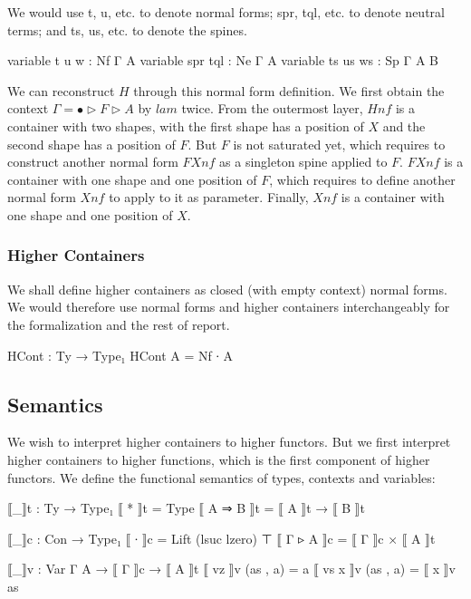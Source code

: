 We would use t, u, etc. to denote normal forms; spr, tql, etc. to denote neutral terms; and ts, us, etc. to denote the spines.

\begin{code}[hide]
variable t u w : Nf Γ A
variable spr tql : Ne Γ A
variable ts us ws : Sp Γ A B
\end{code}

We can reconstruct $H$ through this normal form definition. We first obtain the context $\Gamma = \bullet \triangleright F \triangleright A$ by $lam$ twice. From the outermost layer, $Hnf$ is a container with two shapes, with the first shape has a position of $X$ and the second shape has a position of $F$. But $F$ is not saturated yet, which requires to construct another normal form $FXnf$ as a singleton spine applied to $F$. $FXnf$ is a container with one shape and one position of $F$, which requires to define another normal form $Xnf$ to apply to it as parameter. Finally, $Xnf$ is a container with one shape and one position of $X$. \hyperref[Hnf]{\faCog}

\subsubsection{Higher Containers}

We shall define higher containers as closed (with empty context) normal forms. We would therefore use normal forms and higher containers interchangeably for the formalization and the rest of report.

\begin{code}
HCont : Ty → Type₁
HCont A = Nf ∙ A
\end{code}

\subsection{Semantics}

We wish to interpret higher containers to higher functors. But we first interpret higher containers to higher functions, which is the first component of higher functors. We define the functional semantics of types, contexts and variables:

\begin{code}
⟦_⟧t : Ty → Type₁
⟦ * ⟧t = Type
⟦ A ⇒ B ⟧t = ⟦ A ⟧t → ⟦ B ⟧t

⟦_⟧c : Con → Type₁
⟦ ∙ ⟧c = Lift (lsuc lzero) ⊤
⟦ Γ ▹ A ⟧c = ⟦ Γ ⟧c × ⟦ A ⟧t

⟦_⟧v : Var Γ A → ⟦ Γ ⟧c → ⟦ A ⟧t
⟦ vz ⟧v (as , a) = a
⟦ vs x ⟧v (as , a) = ⟦ x ⟧v as
\end{code}

